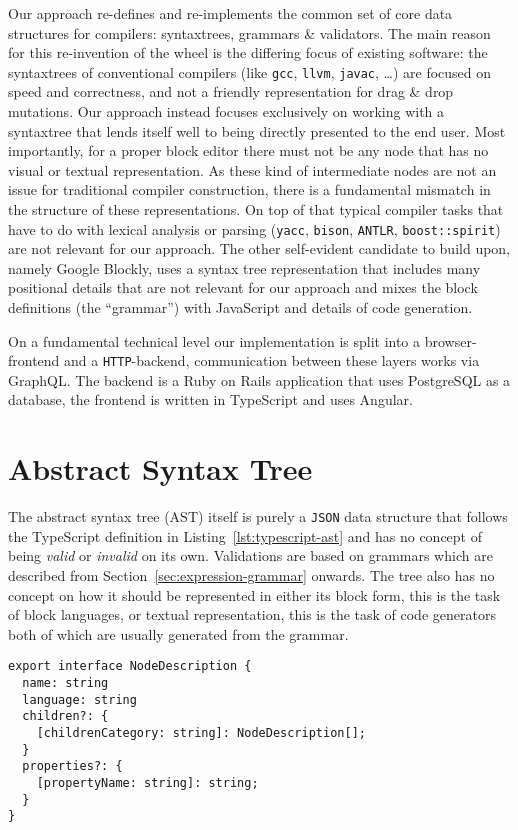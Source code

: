 \documentclass[sigconf,natbib=false]{acmart}
\newcommand{\enquote}[1]{``#1''}
\begin{document}
Our approach re-defines and re-implements the common set of core data structures for compilers: syntax\-trees, grammars \& validators. The main reason for this re-invention of the wheel is the differing focus of existing software: the syntaxtrees of conventional compilers (like \texttt{gcc}, \texttt{llvm}, \texttt{javac}, …) are focused on speed and correctness, and not a friendly representation for drag \& drop mutations. Our approach instead focuses exclusively on working with a syntaxtree that lends itself well to being directly presented to the end user. Most importantly, for a proper block editor there must not be any node that has no visual or textual representation. As these kind of intermediate nodes are not an issue for traditional compiler construction, there is a fundamental mismatch in the structure of these representations. On top of that typical compiler tasks that have to do with lexical analysis or parsing (\texttt{yacc}, \texttt{bison}, \texttt{ANTLR}, \texttt{boost::spirit}) are not relevant for our approach. The other self-evident candidate to build upon, namely Google Blockly, uses a syntax tree representation that includes many positional details that are not relevant for our approach and mixes the block definitions (the \enquote{grammar}) with JavaScript and details of code generation.

On a fundamental technical level our implementation is split into a browser-frontend and a \texttt{HTTP}-backend, communication between these layers works via GraphQL. The backend is a Ruby on Rails application that uses PostgreSQL as a database, the frontend is written in TypeScript and uses Angular.

\section{Abstract Syntax Tree}
\label{sec:abstract-syntax-tree}

The abstract syntax tree (AST) itself is purely a \texttt{JSON} data structure that follows the TypeScript definition in Listing~\ref{lst:typescript-ast} and has no concept of being \textit{valid} or \textit{invalid} on its own. Validations are based on grammars which are described from Section~\ref{sec:expression-grammar} onwards. The tree also has no concept on how it should be represented in either its block form, this is the task of block languages, or textual representation, this is the task of code generators both of which are usually generated from the grammar.

\begin{lstlisting}[caption={TypeScript definition of AST}, label=lst:typescript-ast]
export interface NodeDescription {
  name: string
  language: string
  children?: {
    [childrenCategory: string]: NodeDescription[];
  }
  properties?: {
    [propertyName: string]: string;
  }
}
\end{lstlisting}
\end{document}
